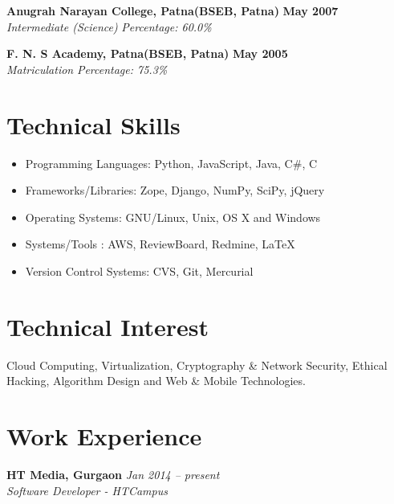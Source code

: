 \documentclass[margin,line]{resume}
\begin{document}
\begin{resume}
    \textbf{Anugrah Narayan College, Patna(BSEB, Patna)} \hfill \textbf{May 2007}\vspace{0mm}\\\vspace{0mm}%
    \textsl{Intermediate (Science)} \hfill \textsl{Percentage: 60.0\%}

    \textbf{F. N. S Academy, Patna(BSEB, Patna)} \hfill \textbf{May 2005}\vspace{0mm}\\\vspace{0mm}%
    \textsl{Matriculation } \hfill \textsl{Percentage: 75.3\%}
    \section{\mysidestyle Technical Skills}
     \begin{itemize}
      \item Programming Languages: Python, JavaScript, Java, C\#, C
      \item Frameworks/Libraries: Zope, Django, NumPy, SciPy, jQuery
      \item Operating Systems: GNU/Linux, Unix, OS X and Windows
      \item Systems/Tools : AWS, ReviewBoard, Redmine, \LaTeX
      \item Version Control Systems: CVS, Git, Mercurial      
     \end{itemize}
     \section{\mysidestyle Technical Interest}
        Cloud Computing, Virtualization, Cryptography \& Network Security, Ethical Hacking, Algorithm Design and Web \& Mobile Technologies.
    \section{\mysidestyle Work Experience}

    \textbf{HT Media, Gurgaon} \hfill \textsl{Jan 2014 -- present} \vspace{0mm}\\\vspace{0mm}%
           \textsl{Software Developer - HTCampus}\\
    \begin{itemize}
    

\end{itemize}
\end{resume}
\end{document}
